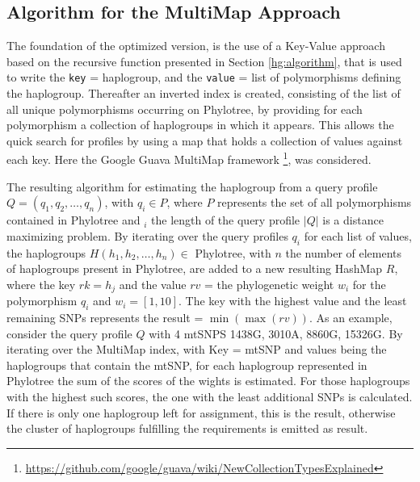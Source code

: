 \subsection{Algorithm for the MultiMap Approach}
The foundation of the optimized version, is the use of a Key-Value approach based on the recursive function presented in Section \ref{hg:algorithm}, that is used to write the \texttt{key} = haplogroup, and the \texttt{value} = list of polymorphisms defining the haplogroup. Thereafter an inverted index is created, consisting of the list of all unique polymorphisms occurring on Phylotree, by providing for each polymorphism a collection of haplogroups in which it appears. This allows the quick search for profiles by using a map that holds a collection of values against each key. Here the Google Guava MultiMap framework \footnote{\url{https://github.com/google/guava/wiki/NewCollectionTypesExplained}}, was considered.

The resulting algorithm for estimating the haplogroup from a query profile $Q  = \left(q_1,q_2,\dotsc,q_n\right)$, with $q_i \in P$, where $P$ represents the set of all polymorphisms contained in Phylotree and $_i$ the length of the query profile $|Q|$ is a distance maximizing problem. By iterating over the query profiles $q_i$ for each list of values, the haplogroups $H \left(h_1,h_2,\dotsc,h_n\right) \in$ Phylotree, with $n$ the number of elements of haplogroups present in Phylotree, are added to a new resulting HashMap $R$, where the key $rk = h_j$ and the value $rv$ = the phylogenetic weight $w_i$ for the polymorphism $q_i$ and $w_i = \left[1, 10\right]$. The key with the highest value and the least remaining SNPs represents the result = $ \min\left(\max\left(rv\right)\right)$. 
As an example, consider the query profile $Q$ with 4 mtSNPS  1438G, 3010A, 8860G, 15326G. By iterating over the MultiMap index, with Key = mtSNP and values being the haplogroups that contain the mtSNP, for each haplogroup represented in Phylotree the sum of the scores of the wights is estimated. For those haplogroups with the highest such scores, the one with the least additional SNPs is calculated. If there is only one haplogroup left for assignment, this is the result, otherwise the cluster of haplogroups fulfilling the requirements is emitted as result.

